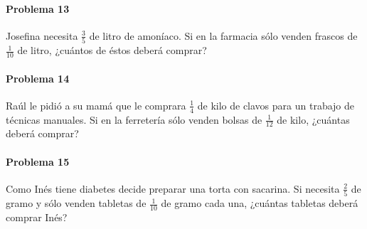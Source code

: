 \documentclass[10pt,twoside]{article}
\begin{document}
\paragraph*{Problema 13}
Josefina necesita $\frac{3}{5}$ de litro de amoníaco. Si en la farmacia sólo venden frascos de $\frac{1}{10}$ de litro, ¿cuántos de éstos deberá comprar?
\paragraph*{Problema 14}
Raúl le pidió a su mamá que le comprara $\frac{1}{4}$ de kilo de clavos para un trabajo de técnicas manuales. Si en la ferretería sólo venden bolsas de $\frac{1}{12}$ de kilo, ¿cuántas deberá comprar?
\paragraph*{Problema 15}
Como Inés tiene diabetes decide preparar una torta con sacarina. Si necesita $\frac{2}{5}$ de gramo y sólo venden tabletas de $\frac{1}{10}$ de gramo cada una, ¿cuántas tabletas deberá comprar Inés?
\end{document}
